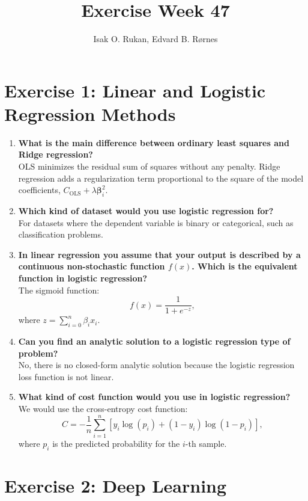 \documentclass[a4paper,12pt]{article}
\title{Exercise Week 47}
\author{Isak O. Rukan, Edvard B. Rørnes}
\begin{document}
\maketitle
	
	\section*{Exercise 1: Linear and Logistic Regression Methods}
	
	\begin{enumerate}
		\item \textbf{What is the main difference between ordinary least squares and Ridge regression?} \\
		OLS minimizes the residual sum of squares without any penalty. Ridge regression adds a regularization term proportional to the square of the model coefficients, $C_\text{OLS}+\lambda\bm\beta_i^2$.
		
		\item \textbf{Which kind of dataset would you use logistic regression for?} \\
		For datasets where the dependent variable is binary or categorical, such as classification problems.
		
		\item \textbf{In linear regression you assume that your output is described by a continuous non-stochastic function $f(x)$. Which is the equivalent function in logistic regression?} \\
		The sigmoid function:
		\[f(x) = \frac{1}{1 + e^{-z}},\]
		where $z=\sum_{i=0}^n\beta_ix_i$.
		
		\item \textbf{Can you find an analytic solution to a logistic regression type of problem?} \\
		No, there is no closed-form analytic solution because the logistic regression loss function is not linear.
		
		\item \textbf{What kind of cost function would you use in logistic regression?} \\
		We would use the cross-entropy cost function:
		\[C=-\frac{1}{n}\sum_{i=1}^n\left[y_i\log(p_i)+(1-y_i) \log(1-p_i)\right],\]
		where $p_i$ is the predicted probability for the $i$-th sample.
	\end{enumerate}
	
	\section*{Exercise 2: Deep Learning}
	
\end{document}
